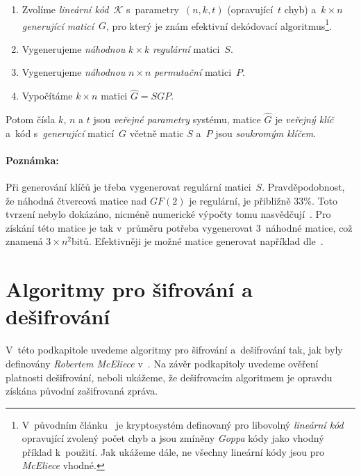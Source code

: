 \documentclass[thesis=M,czech,hidelinks]{FITthesis}[2012/06/26]
\newcommand{\0}{{\textcolor[gray]{0.75}{0}}}
\begin{document}
\begin{enumerate}
    \item Zvolíme \emph{lineární kód}~$\mathcal{K}$ s~parametry~$(n,k,t)$
        (opravující~$t$ chyb) a~$k \times n$ \emph{generující maticí}~$G$,
        pro který je znám efektivní dekódovací algoritmus\footnote{
            V~původním článku~\cite{McEliece} je kryptosystém definovaný pro
            libovolný \emph{lineární kód} opravující zvolený počet chyb a jsou
            zmíněny \emph{Goppa} kódy jako vhodný příklad k~použití. Jak ukážeme
            dále, ne všechny lineární kódy jsou pro \emph{McEliece} vhodné.
        }.
    \item Vygenerujeme \emph{náhodnou} $k \times k$ \emph{regulární} matici~$S$.
    \item Vygenerujeme \emph{náhodnou} $n \times n$ \emph{permutační} matici~$P$.
    \item Vypočítáme $k \times n$ matici $\hat{G} = S G P$.
\end{enumerate}

Potom čísla $k$, $n$ a $t$ jsou \emph{veřejné parametry} systému, matice
$\hat{G}$ je \emph{veřejný klíč} a~kód s~\emph{generující} maticí~$G$ včetně
matic $S$ a~$P$ jsou \emph{soukromým klíčem}.


\paragraph{Poznámka:} Při generování klíčů je třeba vygenerovat regulární
matici~$S$. Pravděpodobnost, že náhodná čtvercová matice nad $GF(2)$ je
regulární, je přibližně $33$\;\%. Toto tvrzení nebylo dokázáno, nicméně
numerické výpočty tomu nasvědčují~\cite{Heyse}. Pro získání této matice je tak
v~průměru potřeba vygenerovat $3$~náhodné matice, což znamená
$3\times n^2$\;bitů. Efektivněji je možné matice generovat například
dle~\cite{Randall}.



\section{Algoritmy pro šifrování a dešifrování}\label{kap_mceliece_algoritmy}

V~této podkapitole uvedeme algoritmy pro šifrování a~dešifrování tak, jak byly
definovány \emph{Robertem McEliece} v~\cite{McEliece}. Na závěr podkapitoly
uvedeme ověření platnosti dešifrování, neboli ukážeme, že dešifrovacím
algoritmem je opravdu získána původní zašifrovaná zpráva.
\end{document}
